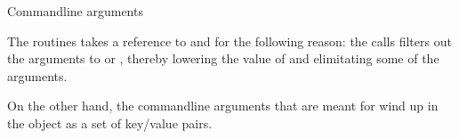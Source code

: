  {Commandline arguments}

The  routines takes a reference to 
and  for the following reason: the  calls
filters out the arguments to  or ,
thereby lowering the value of  and elimitating some of the 
arguments.

On the other hand, the commandline arguments that are meant for 
wind up in the  object as a set of key/value pairs.



